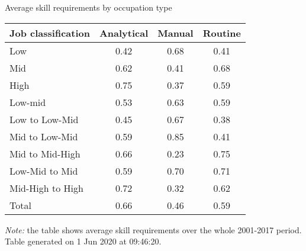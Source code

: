 \begin{center}
\begin{threeparttable}[!h]
\caption{Average skill requirements by occupation type}
\begin{tabular}{lccc}
\toprule
\toprule
\textbf{Job classification}&\multicolumn{1}{c}{\textbf{Analytical}}&\multicolumn{1}{c}{\textbf{Manual}}&\multicolumn{1}{c}{\textbf{Routine}} \\
\midrule
\midrule
Low&0.42&0.68&0.41 \\
Mid&0.62&0.41&0.68 \\
High&0.75&0.37&0.59 \\
Low-mid&0.53&0.63&0.59 \\
Low to Low-Mid&0.45&0.67&0.38 \\
Mid to Low-Mid&0.59&0.85&0.41 \\
Mid to Mid-High&0.66&0.23&0.75 \\
Low-Mid to Mid&0.59&0.70&0.71 \\
Mid-High to High&0.72&0.32&0.62 \\
Total&0.66&0.46&0.59 \\
\bottomrule
\bottomrule
\end{tabular}
\begin{tablenotes}
\item \footnotesize \textit{Note:} the table shows average skill requirements over the whole 2001-2017 period. Table generated on  1 Jun 2020 at 09:46:20.
\end{tablenotes}
\end{threeparttable}
\end{center}
